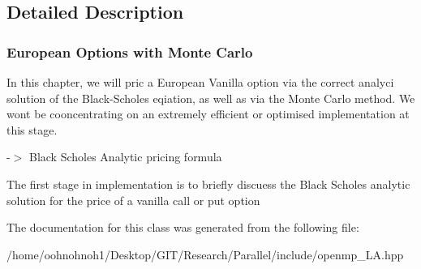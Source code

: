 \subsection{Detailed Description}
\subsubsection*{European Options with Monte Carlo }

In this chapter, we will pric a European Vanilla option via the correct analyci solution of the Black-\/\+Scholes eqiation, as well as via the Monte Carlo method. We won\textquotesingle{}t be cooncentrating on an extremely efficient or optimised implementation at this stage.

-\/$>$ Black Scholes Analytic pricing formula

The first stage in implementation is to briefly discuess the Black Scholes analytic solution for the price of a vanilla call or put option 

The documentation for this class was generated from the following file\+:\begin{DoxyCompactItemize}
\item 
/home/oohnohnoh1/\+Desktop/\+G\+I\+T/\+Research/\+Parallel/include/openmp\+\_\+\+L\+A.\+hpp\end{DoxyCompactItemize}
